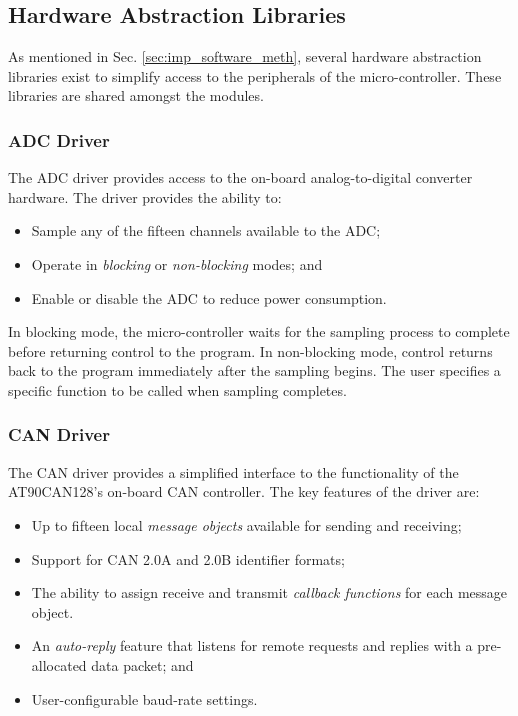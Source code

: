\subsection{Hardware Abstraction Libraries}

As mentioned in Sec. \ref{sec:imp_software_meth}, several hardware abstraction libraries exist to simplify access to the peripherals of the micro-controller. These libraries are shared amongst the modules. 

\subsubsection{ADC Driver}

The ADC driver provides access to the on-board analog-to-digital converter hardware. The driver provides the ability to:

\begin{itemize}
	\item Sample any of the fifteen channels available to the ADC; 
	\item Operate in \emph{blocking} or \emph{non-blocking} modes; and
	\item Enable or disable the ADC to reduce power consumption.
\end{itemize}

In blocking mode, the micro-controller waits for the sampling process to complete before returning control to the program. In non-blocking mode, control returns back to the program immediately after the sampling begins. The user specifies a specific function to be called when sampling completes. 

\subsubsection{CAN Driver}
\label{sec:impl_can_driver}

The CAN driver provides a simplified interface to the functionality of the AT90CAN128's on-board CAN controller. The key features of the driver are:

\begin{itemize}
	\item Up to fifteen local \emph{message objects} available for sending and receiving;
	\item Support for CAN 2.0A and 2.0B identifier formats;
	\item The ability to assign receive and transmit \emph{callback functions} for each message object.
	\item An \emph{auto-reply} feature that listens for remote requests and replies with a pre-allocated data packet; and
	\item User-configurable baud-rate settings.
\end{itemize}

